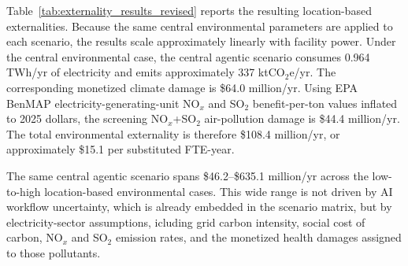 \documentclass{article}
\begin{document}
Table~\ref{tab:externality_results_revised} reports the resulting location-based externalities. Because the same central environmental parameters are applied to each scenario, the results scale approximately linearly with facility power. Under the central environmental case, the central agentic scenario consumes 0.964 TWh/yr of electricity and emits approximately 337 ktCO$_2$e/yr. The corresponding monetized climate damage is \$64.0 million/yr. Using EPA BenMAP electricity-generating-unit NO$_x$ and SO$_2$ benefit-per-ton values inflated to 2025 dollars, the screening NO$_x$+SO$_2$ air-pollution damage is \$44.4 million/yr. The total environmental externality is therefore \$108.4 million/yr, or approximately \$15.1 per substituted FTE-year.

The same central agentic scenario spans \$46.2--\$635.1 million/yr across the low-to-high location-based environmental cases. This wide range is not driven by AI workflow uncertainty, which is already embedded in the scenario matrix, but by electricity-sector assumptions, icluding grid carbon intensity, social cost of carbon, NO$_x$ and SO$_2$ emission rates, and the monetized health damages assigned to those pollutants.

\begin{table}[htbp]
\centering
\caption{Carbon and air-pollution externality results using the revised Table~3 parameters. Central values use U.S. average eGRID 2023 emission rates, EPA central SCC of \$190/tCO$_2$, and EPA BenMAP EGU NO$_x$+SO$_2$ benefit-per-ton values inflated to 2025 dollars. Bracketed ranges combine the low-emissions CAMX/low-SCC case and the high-emissions PRMS/high-SCC case. Air-pollution damages include NO$_x$ and SO$_2$ only and should be interpreted as a limited-scope screening estimate.}
\label{tab:externality_results_revised}
\end{table}
\end{document}
